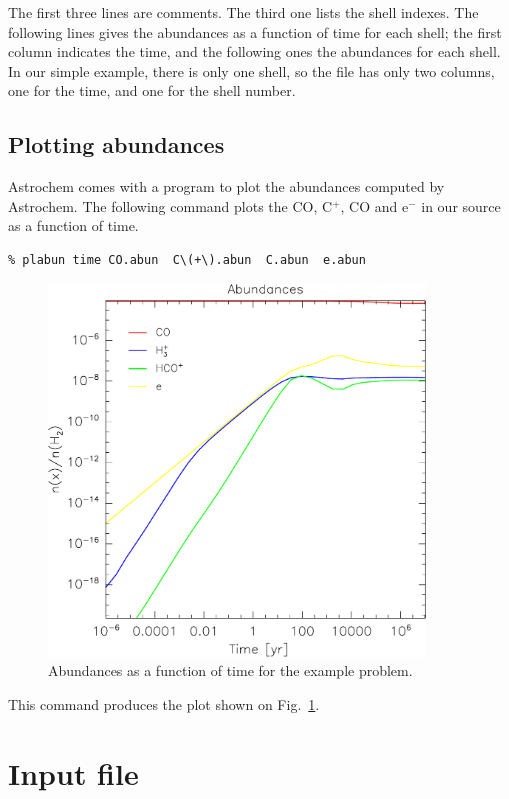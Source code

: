\documentclass[a4paper,12pt]{article}
\begin{document}
{\noindent
The first three lines are comments. The third one lists the shell
indexes. The following lines gives the abundances as a function of
time for each shell; the first column indicates the time, and the
following ones the abundances for each shell. In our simple example,
there is only one shell, so the file has only two columns, one for the
time, and one for the shell number.

\subsection{Plotting abundances}
\label{sec:plotting-abundances}

Astrochem comes with a program to plot the abundances computed by
Astrochem. The following command plots the CO, C$^{+}$, CO and e$^{-}$
in our source as a function of time.

\begin{verbatim}
% plabun time CO.abun  C\(+\).abun  C.abun  e.abun
\end{verbatim}

\begin{figure}
  \begin{center}
    \includegraphics[width=10cm]{examples/abundances.pdf}
  \end{center}
  \caption{Abundances as a function of time for the example problem.}
  \label{fig:example-abundances}
\end{figure}

\noindent
This command produces the plot shown on
Fig.~\ref{fig:example-abundances}.

\section{Input file}
\label{sec:input-file}

}
\end{document}

